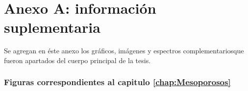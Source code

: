 \cleardoublepage{}
{}
\FormatoAnexoA

\AddLabelsAxUno

\let\originalstyle=\thispagestyle            %
\def\thispagestyle#1{\fancyfoot[C]{}}       %
\def\thispagestyle#1{\originalstyle{empty}} %
\def\thispagestyle#1{}                       %

\renewcommand\thefigure{A.\arabic{figure}} 

\chapter*{Anexo A: información suplementaria}
    
    Se agregan en éste anexo los gráficos, imágenes y espectros complementariosque fueron apartados del cuerpo principal de la tesis. 

    \subsection*{Figuras correspondientes al capitulo \ref{chap:Mesoporosos}}


